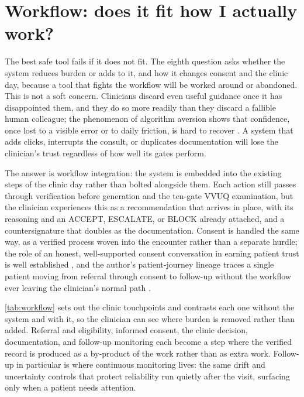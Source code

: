 \section{Workflow: does it fit how I actually work?}
\label{sec:workflow}

The best safe tool fails if it does not fit. The eighth question asks whether the
system reduces burden or adds to it, and how it changes consent and the clinic day,
because a tool that fights the workflow will be worked around or abandoned. This is
not a soft concern. Clinicians discard even useful guidance once it has disappointed
them, and they do so more readily than they discard a fallible human colleague; the
phenomenon of algorithm aversion shows that confidence, once lost to a visible
error or to daily friction, is hard to recover \cite{dietvorst2015algorithm}. A
system that adds clicks, interrupts the consult, or duplicates documentation will
lose the clinician's trust regardless of how well its gates perform.

The answer is workflow integration: the system is embedded into the existing steps
of the clinic day rather than bolted alongside them. Each action still passes
through verification before generation and the ten-gate VVUQ examination, but the
clinician experiences this as a recommendation that arrives in place, with its
reasoning and an ACCEPT, ESCALATE, or BLOCK already attached, and a countersignature
that doubles as the documentation. Consent is handled the same way, as a verified
process woven into the encounter rather than a separate hurdle; the role of an
honest, well-supported consent conversation in earning patient trust is well
established \cite{novak2020patient}, and the author's patient-journey lineage traces
a single patient moving from referral through consent to follow-up without the
workflow ever leaving the clinician's normal path \cite{Kawchak2026CancerPatientsJourney}.

\autoref{tab:workflow} sets out the clinic touchpoints and contrasts each one
without the system and with it, so the clinician can see where burden is removed
rather than added. Referral and eligibility, informed consent, the clinic decision,
documentation, and follow-up monitoring each become a step where the verified record
is produced as a by-product of the work rather than as extra work. Follow-up in
particular is where continuous monitoring lives: the same drift and uncertainty
controls that protect reliability run quietly after the visit, surfacing only when a
patient needs attention.

